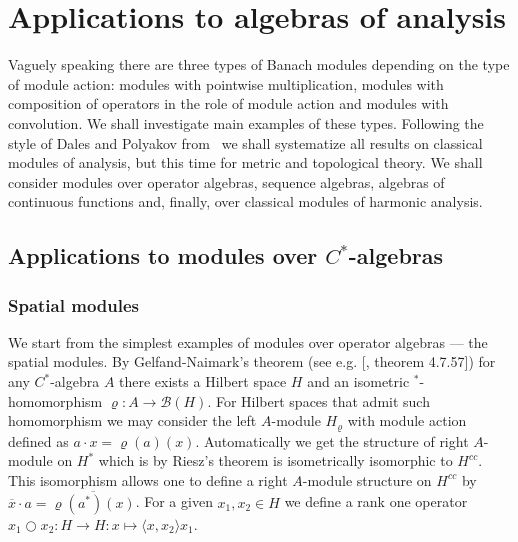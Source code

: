 \chapter{
    Applications to algebras of analysis}\label{ChapterApplicationsToAlgebrasOfAnalysis} 


Vaguely speaking there are three types of Banach modules depending on the type
of module action: modules with pointwise multiplication, modules with
composition of operators in the role of module action and modules with
convolution. We shall investigate main examples of these types. Following the
style of Dales and Polyakov from~\cite{DalPolHomolPropGrAlg} we shall
systematize all results on classical modules of analysis, but this time for
metric and topological theory. We shall consider modules over operator algebras,
sequence algebras, algebras of continuous functions and, finally, over classical
modules of harmonic analysis.



\section{
    Applications to modules over \texorpdfstring{$C^*$}{C*}-algebras}\label{
SectionApplicationsToModulesOverCStarAlgebras}


\subsection{
    Spatial modules}\label{SubSectionSpatialModules}

We start from the simplest  examples of modules over operator algebras --- the
spatial modules. By Gelfand-Naimark's theorem (see e.g.
[\cite{HelBanLocConvAlg}, theorem 4.7.57]) for any $C^*$-algebra $A$ there
exists a Hilbert space $H$ and an isometric ${}^*$-homomorphism
$\varrho:A\to\mathcal{B}(H)$. For Hilbert spaces that admit such homomorphism we
may consider the left $A$-module $H_\varrho$ with module action defined as
$a\cdot x=\varrho(a)(x)$. Automatically we get the structure of right $A$-module
on $H^*$ which is by Riesz's theorem is isometrically isomorphic to $H^{cc}$.
This isomorphism allows one to define a right $A$-module structure on $H^{cc}$
by $\overline{x}\cdot a=\overline{\varrho(a^*)(x)}$. For a given $x_1,x_2\in H$
we define a rank one operator 
$x_1\bigcirc x_2:H\to H:x\mapsto \langle x, x_2\rangle x_1$. 

